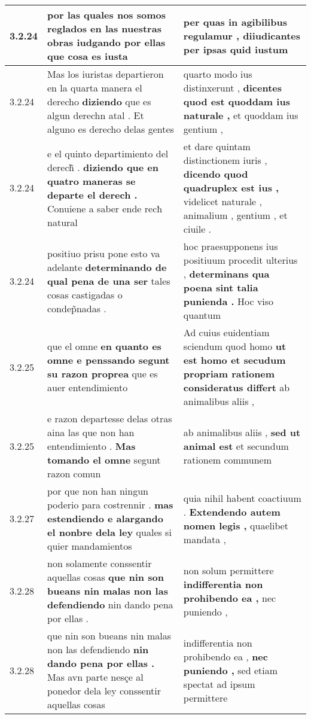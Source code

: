 \begin{tabular}{|p{1cm}|p{6.5cm}|p{6.5cm}|}
3.2.24 & por las quales nos somos reglados en las nuestras obras \textbf{ iudgando por ellas } que cosa es iusta & per quas in agibilibus regulamur , \textbf{ diiudicantes per ipsas } quid iustum \\\hline
3.2.24 & Mas los iuristas departieron en la quarta manera el derecho \textbf{ diziendo } que es algun derechn atal . Et alguno es derecho delas gentes & quarto modo ius distinxerunt , \textbf{ dicentes quod est quoddam ius naturale , } et quoddam ius gentium , \\\hline
3.2.24 & e el quinto departimiento del derech̃ . \textbf{ diziendo que en quatro maneras se departe el derech . } Conuiene a saber ende recħ natural & et dare quintam distinctionem iuris , \textbf{ dicendo quod quadruplex est ius , } videlicet naturale , animalium , gentium , et ciuile . \\\hline
3.2.24 & positiuo prisu pone esto va adelante \textbf{ determinando de qual pena de una ser } tales cosas castigadas o condep̃nadas . & hoc praesupponens ius positiuum procedit ulterius , \textbf{ determinans qua poena sint talia punienda . } Hoc viso quantum \\\hline
3.2.25 & que el omne \textbf{ en quanto es omne e penssando segunt su razon proprea } que es auer entendimiento & Ad cuius euidentiam sciendum quod homo \textbf{ ut est homo et secudum propriam rationem consideratus differt } ab animalibus aliis , \\\hline
3.2.25 & e razon departesse delas otras aina las que non han entendimiento . \textbf{ Mas tomando el omne } segunt razon comun & ab animalibus aliis , \textbf{ sed ut animal est } et secundum rationem communem \\\hline
3.2.27 & por que non han ningun poderio para costrennir . \textbf{ mas estendiendo e alargando el nonbre dela ley } quales si quier mandamientos & quia nihil habent coactiuum . \textbf{ Extendendo autem nomen legis , } quaelibet mandata , \\\hline
3.2.28 & non solamente conssentir aquellas cosas \textbf{ que nin son bueans nin malas non las defendiendo } nin dando pena por ellas . & non solum permittere \textbf{ indifferentia non prohibendo ea , } nec puniendo , \\\hline
3.2.28 & que nin son bueans nin malas non las defendiendo \textbf{ nin dando pena por ellas . } Mas avn parte nesçe al ponedor dela ley conssentir aquellas cosas & indifferentia non prohibendo ea , \textbf{ nec puniendo , } sed etiam spectat ad ipsum permittere \\\hline

\end{tabular}
